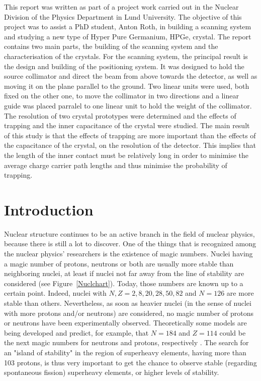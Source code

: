 \documentclass[11pt,a4paper]{article}
\begin{document}
This report was written as part of a project work carried out in the Nuclear Division of the Physics Department in Lund University. The objective of this project was to assist a PhD student, Anton Roth, in building a scanning system and studying a new type of Hyper Pure Germanium, HPGe, crystal. The report contains two main parts, the building of the scanning system and the characterisation of the crystals. For the scanning system, the principal result is the design and building of the positioning system. It was designed to hold the source collimator and direct the beam from above towards the detector, as well as moving it on the plane parallel to the ground. Two linear units were used, both fixed on the other one, to move the collimator in two directions and a linear guide was placed parralel to one linear unit to hold the weight of the collimator. The resolution of two crystal prototypes were determined and the effects of trapping and the inner capacitance of the crystal were studied. The main result of this study is that the effects of trapping are more important than the effects of the capacitance of the crystal, on the resolution of the detector. This implies that the length of the inner contact must be relatively long in order to minimise the average charge carrier path lengths and thus minimise the probability of trapping.

\null\vfill

\newpage
\tableofcontents
\thispagestyle{empty}
\setcounter{page}{1}
\clearpage

\section{Introduction}

Nuclear structure continues to be an active branch in the field of nuclear physics, because there is still a lot to discover. One of the things that is recognized among the nuclear physics' researchers is the existence of magic numbers. Nuclei having a magic number of protons, neutrons or both are usually more stable than neighboring nuclei, at least if nuclei not far away from the line of stability are considered (see Figure~\ref{Nuclchart}). Today, those numbers are known up to a certain point. Indeed, nuclei with $N, Z = 2, 8, 20, 28, 50, 82$ and $N = 126$ are more stable than others. Nevertheless, as soon as heavier nuclei (in the sense of nuclei with more protons and/or neutrons) are considered, no magic number of protons or neutrons have been experimentally observed. Theoretically some models are being developed and predict, for example, that $N = 184$ and $Z = 114$ could be the next magic numbers for neutrons and protons, respectively \cite{Sobi}. The search for an "island of stability" in the region of superheavy elements, having more than 103 protons, is thus very important to get the chance to observe stable (regarding spontaneous fission) superheavy elements, or higher levels of stability.
\end{document}
